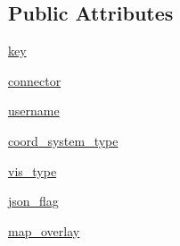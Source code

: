 \subsection*{Public Attributes}
\begin{DoxyCompactItemize}
\item 
\mbox{\hyperlink{classbridges_1_1bridges_1_1_bridges_a7a071a40acc8903cb0dffc106160cb9d}{key}}
\item 
\mbox{\hyperlink{classbridges_1_1bridges_1_1_bridges_a1c02ee44e7a4a3ee2f7d9c7d7da7d09f}{connector}}
\item 
\mbox{\hyperlink{classbridges_1_1bridges_1_1_bridges_ac68532895ac5044fa175b673fb567a5e}{username}}
\item 
\mbox{\hyperlink{classbridges_1_1bridges_1_1_bridges_abcee636f07ecf127be16562f5b84e7f7}{coord\+\_\+system\+\_\+type}}
\item 
\mbox{\hyperlink{classbridges_1_1bridges_1_1_bridges_a5ca152bf3830e2be1f72247463916f82}{vis\+\_\+type}}
\item 
\mbox{\hyperlink{classbridges_1_1bridges_1_1_bridges_ae766e8b9faa590137c3d9e65f04b7d93}{json\+\_\+flag}}
\item 
\mbox{\hyperlink{classbridges_1_1bridges_1_1_bridges_aa67713c0f2a1c05b5732eb9b046ec79b}{map\+\_\+overlay}}
\end{DoxyCompactItemize}
